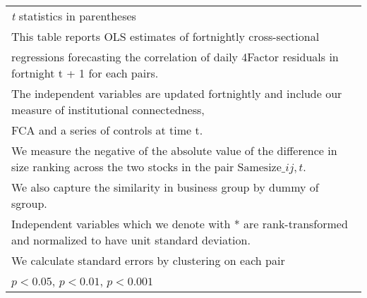 {\begin{tabular}{l*{7}{c}}
\hline\hline
\multicolumn{8}{l}{\footnotesize \textit{t} statistics in parentheses}\\
\multicolumn{8}{l}{\footnotesize This table reports OLS estimates of fortnightly cross-sectional}\\
\multicolumn{8}{l}{\footnotesize  regressions forecasting the correlation of daily 4Factor residuals in fortnight t + 1 for each pairs.}\\
\multicolumn{8}{l}{\footnotesize The independent variables are updated fortnightly and include our measure of institutional connectedness,}\\
\multicolumn{8}{l}{\footnotesize  FCA and a series of controls at time t.}\\
\multicolumn{8}{l}{\footnotesize We measure the negative of the absolute value of the difference in size ranking across the two stocks in the pair $ \text{Samesize}\_{ij,t} $.}\\
\multicolumn{8}{l}{\footnotesize We also capture the similarity in business group by dummy of sgroup.}\\
\multicolumn{8}{l}{\footnotesize Independent variables which  we denote with * are rank-transformed and normalized to have unit standard deviation.}\\
\multicolumn{8}{l}{\footnotesize  We calculate standard errors by clustering on each pair}\\
\multicolumn{8}{l}{\footnotesize \sym{*} \(p<0.05\), \sym{**} \(p<0.01\), \sym{***} \(p<0.001\)}\\
\end{tabular}
}
